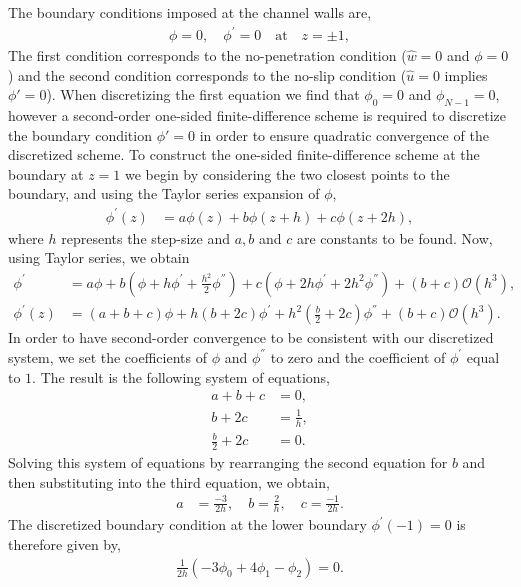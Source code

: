 \documentclass[a4paper, 12pt, twoside, openright]{article}
\numberwithin{equation}{section}
\begin{document}
The boundary conditions imposed at the channel walls are,
\begin{align}
\phi = 0, \quad \phi^{\prime} = 0 \quad \text{at} \quad z=\pm1,  
\end{align} 
The first condition corresponds to the no-penetration condition  ($\hat w = 0$ and $\phi = 0$) and the second condition corresponds to the no-slip condition ($\hat u = 0$ implies $\phi' = 0$). When discretizing the first equation we find that $\phi_0 = 0$ and $\phi_{N-1} = 0$, however a second-order one-sided finite-difference scheme is required to discretize the boundary condition $\phi' = 0$ in order to ensure quadratic convergence of the discretized scheme. To construct the one-sided finite-difference scheme at the boundary at $z=1$ we begin by considering the two closest points to the boundary, and using the Taylor series expansion of $\phi$,
\begin{align}
\phi^{\prime}(z) &= a\phi(z) + b\phi(z+h) + c\phi(z+2h),
\end{align}
where $h$ represents the step-size and $a,b$ and $c$ are constants to be found. Now, using Taylor series, we obtain
\begin{align}
\phi^{\prime} &= a\phi + b\left(\phi+h\phi^{\prime}+\frac{h^2}{2}\phi^{''} \right) + c\left(\phi + 2h\phi^{\prime}+2h^{2}\phi^{''}\right) + (b+c)\mathcal{O}(h^3),\\
\phi^{\prime}(z) &= (a+b+c)\phi + h(b+2c)\phi^{\prime} + h^2 \left(\frac{b}{2} + 2c\right)\phi^{''} + (b+c)\mathcal{O}(h^3).
\end{align}  
In order to have second-order convergence to be consistent with our discretized system, we set the coefficients of $\phi$ and $\phi^{''}$ to zero and the coefficient of $\phi^{\prime}$ equal to $1$. The result is the following system of equations,
\begin{align*}
a+b+c &= 0,\\
b+2c &= \frac{1}{h}, \\
\frac{b}{2}+2c &= 0.  
\end{align*} 
Solving this system of equations by rearranging the second equation for $b$ and then substituting into the third equation, we obtain,
\begin{align*}
a &= \frac{-3}{2h},\quad  b = \frac{2}{h},\quad  c = \frac{-1}{2h}. 
\end{align*}
The discretized boundary condition at the lower boundary $\phi^{\prime}(-1) = 0$  is therefore given by,
\begin{align*}
\frac{1}{2h}\left(-3\phi_0 + 4\phi_1-\phi_2 \right) = 0.
\end{align*}
\end{document}
